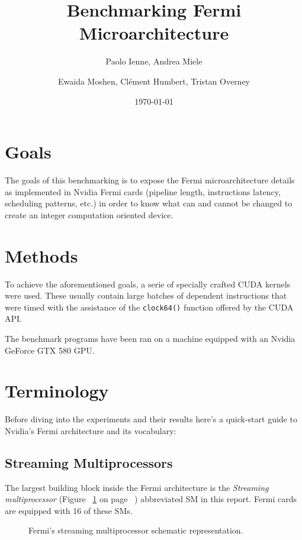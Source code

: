\documentclass{article}
\def \scalingfactor{.8}
\begin{document}
\title{Benchmarking Fermi Microarchitecture}
\author{Paolo Ienne, Andrea Miele\and Ewaida Moshen, Cl\'{e}ment Humbert, Tristan Overney}
\date{\today}
\maketitle

\section{Goals}
	The goals of this benchmarking is to expose the Fermi microarchitecture details
    as implemented in Nvidia Fermi cards (pipeline length, instructions latency,
    scheduling patterns, etc.) in order to know what can and cannot be changed
    to create an integer computation oriented device.

\section{Methods}
	To achieve the aforementioned goals, a serie of specially crafted CUDA kernels
	were used. These usually contain large batches of dependent instructions that were 
	timed with the assistance of the \texttt{clock64()} function offered by the CUDA API.

	The benchmark programs have been ran on a machine equipped with an Nvidia
    GeForce GTX 580 GPU.

\section{Terminology}
    Before diving into the experiments and their results here's a quick-start
    guide to Nvidia's Fermi architecture and its vocabulary:

    \subsection{Streaming Multiprocessors}
    The largest building block inside the Fermi architecture is the 
    \emph{Streaming multiprocessor} (Figure ~\ref{fig:SM} on page 
    ~\pageref{fig:SM}) abbreviated SM in this report. Fermi cards are equipped
    with 16 of these SMs.
    \begin{figure}[H]
    \centering
        \captionsetup{justification=centering}
        \caption{Fermi's streaming multiprocessor schematic representation.}
        \label{fig:SM}
    \end{figure}
\end{document}
